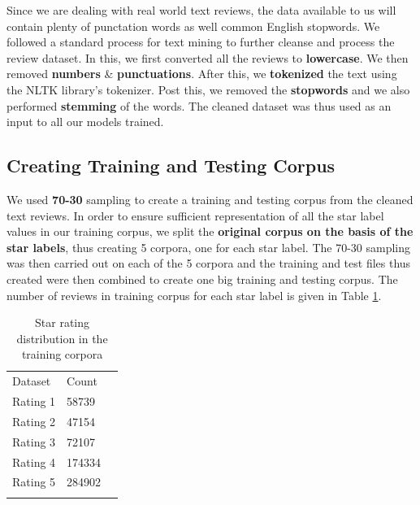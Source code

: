 \documentclass[paper=a4, fontsize=11pt]{scrartcl} %
\numberwithin{equation}{section} %
\numberwithin{figure}{section} %
\numberwithin{table}{section} %
\begin{document}
Since we are dealing with real world text reviews, the data available to us will contain plenty of punctation words as well common English stopwords. We followed a standard process for text mining to further cleanse and process the review dataset. In this, we first converted all the reviews to \textbf{lowercase}. We then removed \textbf{numbers} \& \textbf{punctuations}. After this, we \textbf{tokenized} the text using the NLTK library's tokenizer. Post this, we removed the \textbf{stopwords} and we also performed \textbf{stemming} of the words. The cleaned dataset was thus used as an input to all our models trained.
\subsection{Creating Training and Testing Corpus}
We used \textbf{70-30} sampling to create a training and testing corpus from the cleaned text reviews. In order to ensure sufficient representation of all the star label values in our training corpus, we split the \textbf{original corpus on the basis of the star labels}, thus creating 5 corpora, one for each star label. The 70-30 sampling was then carried out on each of the 5 corpora and the training and test files thus created were then combined to create one big training and testing corpus. The number of reviews in training corpus for each star label is given  in Table \ref{corpus_size}.
\begin{table}[!htb]
 \centering
 \caption{Star rating distribution in the training corpora}
 \label{corpus_size}
 \begin{tabular}{l l l} 
    \noalign{\smallskip}\hline\noalign{\smallskip}
    Dataset & Count \\
    \noalign{\smallskip}\hline\noalign{\smallskip}
    Rating 1 &58739\\
    Rating 2 &47154\\
    Rating 3 &72107\\
    Rating 4 &174334\\
    Rating 5 &284902\\
    \noalign{\smallskip}\hline
  \end{tabular} 
\end{table}  
\end{document}
